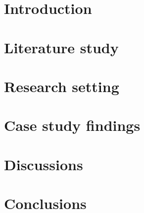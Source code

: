 \documentclass[english,12pt,a4paper,pdftex,sci,utf8]{aaltothesis}
\begin{document}
\newpage

\listoftables


\cleardoublepage
\storeinipagenumber
{}
\setcounter{page}{1}


\section{Introduction} \label{introduction}

\clearpage

\section{Literature study} \label{literature}

\clearpage

\section{Research setting} \label{research setting}

\clearpage

\section{Case study findings} \label{case study}

\clearpage

\section{Discussions} \label{discussions}

\clearpage

\section{Conclusions} \label{conclusions}

\clearpage
\end{document}
